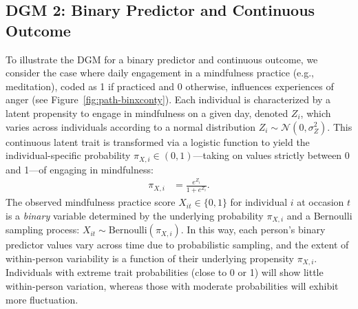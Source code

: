 \documentclass[stu]{apa7}
\begin{document}
\newpage


\subsection{DGM 2: Binary Predictor and Continuous Outcome}

To illustrate the DGM for a binary predictor and continuous outcome, we consider the case where daily engagement in a mindfulness practice (e.g., meditation), coded as 1 if practiced and 0 otherwise, influences experiences of anger (see Figure~\ref{fig:path-binxconty}). Each individual is characterized by a latent propensity to engage in mindfulness on a given day, denoted \( Z_i \), which varies across individuals according to a normal distribution \( Z_i \sim \mathcal{N}(0, \sigma^2_{Z}) \). This continuous latent trait is transformed via a logistic function to yield the individual-specific probability \( \pi_{X,i} \in (0,1) \)---taking on values strictly between 0 and 1---of engaging in mindfulness:
\begin{align}
    \label{eqn:dgm2-level2X}
    \pi_{X,i} &= \frac{e^{Z_i}}{1+ e^{Z_i}}.
\end{align}
The observed mindfulness practice score \( X_{it} \in \{0,1\} \) for individual \( i \) at occasion \( t \) is a \textit{binary} variable determined by the underlying probability \( \pi_{X,i} \) and a Bernoulli sampling process: \( X_{it} \sim \text{Bernoulli}(\pi_{X,i}) \). In this way, each person’s binary predictor values vary across time due to probabilistic sampling, and the extent of within-person variability is a function of their underlying propensity \( \pi_{X,i} \). Individuals with extreme trait probabilities (close to 0 or 1) will show little within-person variation, whereas those with moderate probabilities will exhibit more fluctuation.
\end{document}
